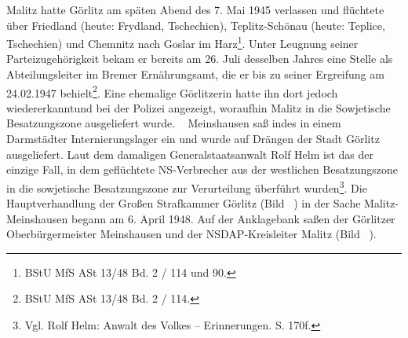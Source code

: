 Malitz hatte Görlitz am späten Abend des 7. Mai 1945 verlassen und flüchtete über Friedland (heute: Frydland, Tschechien), Teplitz-Schönau (heute: Teplice, Tschechien) und Chemnitz nach Goslar im Harz\footnote{BStU MfS ASt 13/48 Bd. 2 / 114 und 90.}. Unter Leugnung seiner Parteizugehörigkeit bekam er bereits am 26. Juli desselben Jahres eine Stelle als Abteilungsleiter im Bremer Ernährungsamt, die er bis zu seiner Ergreifung am 24.02.1947 behielt\footnote{BStU MfS ASt 13/48 Bd. 2 / 114.}. Eine ehemalige Görlitzerin hatte ihn dort jedoch wiedererkannt\linebreak\newpage und bei der Polizei angezeigt, woraufhin Malitz in die Sowjetische Besatzungszone ausgeliefert wurde. 
~\newline
Meinshausen saß indes in einem Darmstädter Internierungslager ein und wurde auf Drängen der Stadt Görlitz ausgeliefert. Laut dem damaligen Generalstaatsanwalt Rolf Helm ist das der einzige Fall, in dem geflüchtete NS-Verbrecher aus der westlichen Besatzungszone in die sowjetische Besatzungszone zur Verurteilung überführt wurden\footnote{Vgl. Rolf Helm: Anwalt des Volkes -- Erinnerungen. S. 170f.}.
\newline
Die Hauptverhandlung der Großen Strafkammer Görlitz (Bild ~) in der Sache Malitz-Meinshausen begann am 6. April 1948. Auf der Anklagebank saßen der Görlitzer Oberbürgermeister Meinshausen und der NSDAP-Kreisleiter Malitz (Bild ~).

